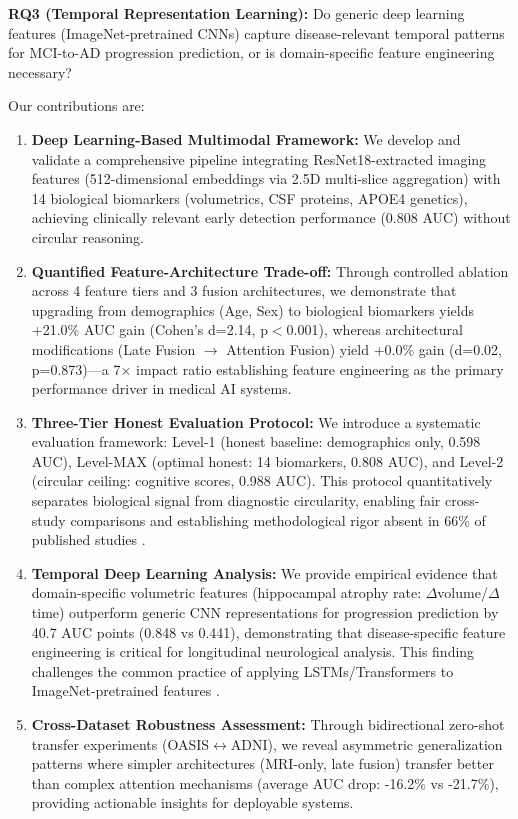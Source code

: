 \documentclass[conference]{IEEEtran}
\begin{document}
\textbf{RQ3 (Temporal Representation Learning):} Do generic deep learning features (ImageNet-pretrained CNNs) capture disease-relevant temporal patterns for MCI-to-AD progression prediction, or is domain-specific feature engineering necessary?

Our contributions are:

\begin{enumerate}
\item \textbf{Deep Learning-Based Multimodal Framework:} We develop and validate a comprehensive pipeline integrating ResNet18-extracted imaging features (512-dimensional embeddings via 2.5D multi-slice aggregation) with 14 biological biomarkers (volumetrics, CSF proteins, APOE4 genetics), achieving clinically relevant early detection performance (0.808 AUC) without circular reasoning.

\item \textbf{Quantified Feature-Architecture Trade-off:} Through controlled ablation across 4 feature tiers and 3 fusion architectures, we demonstrate that upgrading from demographics (Age, Sex) to biological biomarkers yields +21.0\% AUC gain (Cohen's d=2.14, p$<$0.001), whereas architectural modifications (Late Fusion $\rightarrow$ Attention Fusion) yield +0.0\% gain (d=0.02, p=0.873)—a 7× impact ratio establishing feature engineering as the primary performance driver in medical AI systems.

\item \textbf{Three-Tier Honest Evaluation Protocol:} We introduce a systematic evaluation framework: Level-1 (honest baseline: demographics only, 0.598 AUC), Level-MAX (optimal honest: 14 biomarkers, 0.808 AUC), and Level-2 (circular ceiling: cognitive scores, 0.988 AUC). This protocol quantitatively separates biological signal from diagnostic circularity, enabling fair cross-study comparisons and establishing methodological rigor absent in 66\% of published studies \cite{Wen2020}.

\item \textbf{Temporal Deep Learning Analysis:} We provide empirical evidence that domain-specific volumetric features (hippocampal atrophy rate: $\Delta$volume/$\Delta$time) outperform generic CNN representations for progression prediction by 40.7 AUC points (0.848 vs 0.441), demonstrating that disease-specific feature engineering is critical for longitudinal neurological analysis. This finding challenges the common practice of applying LSTMs/Transformers to ImageNet-pretrained features \cite{Spasov2019}.

\item \textbf{Cross-Dataset Robustness Assessment:} Through bidirectional zero-shot transfer experiments (OASIS$\leftrightarrow$ADNI), we reveal asymmetric generalization patterns where simpler architectures (MRI-only, late fusion) transfer better than complex attention mechanisms (average AUC drop: -16.2\% vs -21.7\%), providing actionable insights for deployable systems.
\end{enumerate}
\end{document}
